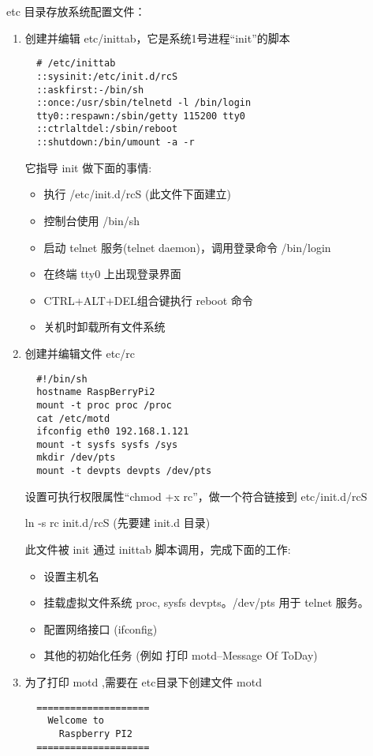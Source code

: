 \documentclass[nofonts]{ctexart}
\begin{document}
  etc 目录存放系统配置文件：
\begin{enumerate}
  \item 创建并编辑 etc/inittab，它是系统1号进程``init''的脚本

  \begin{verbatim}
  # /etc/inittab
  ::sysinit:/etc/init.d/rcS
  ::askfirst:-/bin/sh
  ::once:/usr/sbin/telnetd -l /bin/login
  tty0::respawn:/sbin/getty 115200 tty0
  ::ctrlaltdel:/sbin/reboot
  ::shutdown:/bin/umount -a -r
  \end{verbatim}

  它指导 init 做下面的事情:
  \begin{itemize}
    \item 执行 /etc/init.d/rcS (此文件下面建立)
	\item 控制台使用 /bin/sh
	\item 启动 telnet 服务(telnet daemon)，调用登录命令 /bin/login
	\item 在终端 tty0 上出现登录界面
	\item CTRL+ALT+DEL组合键执行 reboot 命令
	\item 关机时卸载所有文件系统
  \end{itemize}
  \item 创建并编辑文件 etc/rc

  \begin{verbatim}
  #!/bin/sh
  hostname RaspBerryPi2
  mount -t proc proc /proc
  cat /etc/motd
  ifconfig eth0 192.168.1.121
  mount -t sysfs sysfs /sys
  mkdir /dev/pts
  mount -t devpts devpts /dev/pts
  \end{verbatim}

  设置可执行权限属性``chmod +x rc''，做一个符合链接到 etc/init.d/rcS

  ln -s rc init.d/rcS (先要建 init.d 目录)

	此文件被 init 通过 inittab 脚本调用，完成下面的工作:
  \begin{itemize}
    \item 设置主机名
	\item 挂载虚拟文件系统 proc, sysfs devpts。/dev/pts 用于 telnet 服务。
    \item 配置网络接口 (ifconfig)
	\item 其他的初始化任务 (例如 打印 motd--Message Of ToDay)
  \end{itemize}
  \item 为了打印 motd ,需要在 etc目录下创建文件 motd
  \begin{verbatim}
  ====================
    Welcome to
      Raspberry PI2
  ====================
  \end{verbatim}
\end{enumerate}
\end{document}
